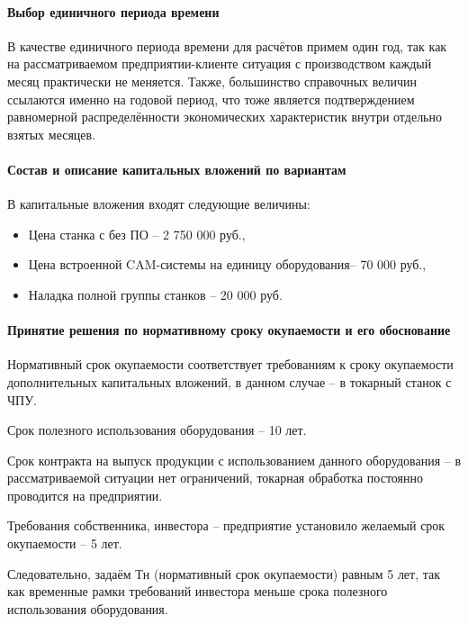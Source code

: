 \paragraph{Выбор единичного периода времени}
\nopagebreak

В качестве единичного периода времени для расчётов примем один год, так как на рассматриваемом предприятии-клиенте ситуация с производством каждый месяц практически не меняется. Также, большинство справочных величин ссылаются именно на годовой период, что тоже является подтверждением равномерной распределённости экономических характеристик внутри отдельно взятых месяцев.

\paragraph{Состав и описание капитальных вложений по вариантам}
\nopagebreak

В капитальные вложения входят следующие величины:

\begin{itemize}
	\item Цена станка с без ПО – 2 750 000 руб.,
	\item Цена встроенной CAM-системы на единицу оборудования– 70 000 руб.,
	\item Наладка полной группы станков – 20 000 руб.
\end{itemize}

\paragraph{Принятие решения по нормативному сроку окупаемости и его обоснование}
\nopagebreak

Нормативный срок окупаемости соответствует требованиям к сроку окупаемости дополнительных капитальных вложений, в данном случае – в токарный станок с ЧПУ.

Срок полезного использования оборудования – 10 лет.

Срок контракта на выпуск продукции с использованием данного оборудования – в рассматриваемой ситуации нет ограничений, токарная обработка постоянно проводится на предприятии.

Требования собственника, инвестора – предприятие установило желаемый срок окупаемости – 5 лет.

Следовательно, задаём Тн (нормативный срок окупаемости) равным 5 лет, так как временные рамки требований инвестора меньше срока полезного использования оборудования.

